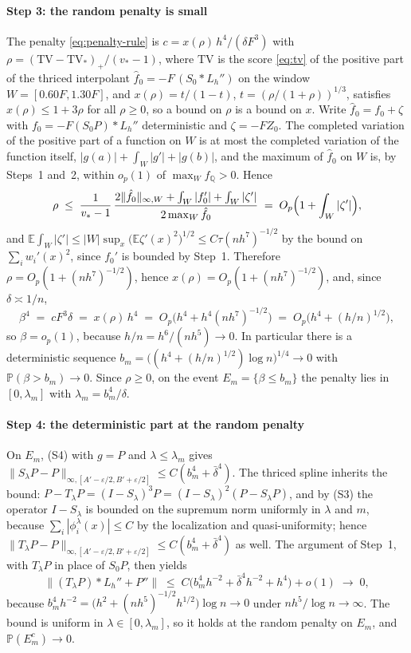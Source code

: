 \documentclass[preprint,12pt,authoryear,times]{elsarticle}
\newcommand{\E}{\mathbb{E}}
\newcommand{\Q}{\mathbb{Q}}
\newcommand{\Prob}{\mathbb{P}}
\newcommand{\TV}{\mathrm{TV}}
\begin{document}
\paragraph{Step 3: the random penalty is small}
The penalty \eqref{eq:penalty-rule} is \(c=x(\rho)\,h^4/(\delta F^3)\) with \(\rho=(\TV-\TV_*)_+/(v_*-1)\), where \(\TV\) is the score \eqref{eq:tv} of the positive part of the thriced interpolant \(\hat f_0=-F\,(S_0\ast L_h'')\) on the window \(W=[0.60F,1.30F]\), and \(x(\rho)=t/(1-t)\), \(t=(\rho/(1+\rho))^{1/3}\), satisfies \(x(\rho)\le 1+3\rho\) for all \(\rho\ge 0\), so a bound on \(\rho\) is a bound on \(x\). Write \(\hat f_0=f_0+\zeta\) with \(f_0=-F(S_0P)\ast L_h''\) deterministic and \(\zeta=-FZ_0\). The completed variation of the positive part of a function on \(W\) is at most the completed variation of the function itself, \(|g(a)|+\int_W|g'|+|g(b)|\), and the maximum of \(\hat f_0\) on \(W\) is, by Steps~1 and~2, within \(o_p(1)\) of \(\max_Wf_{\Q}>0\). Hence
\[
\rho\;\le\;\frac{1}{v_*-1}\,\frac{2\|\hat f_0\|_{\infty,W}+\int_W|f_0'|+\int_W|\zeta'|}{2\max_W\hat f_0}
\;=\;O_p\Bigl(1+\int_W|\zeta'|\Bigr),
\]
and \(\E\int_W|\zeta'|\le|W|\sup_x\bigl(\E\zeta'(x)^2\bigr)^{1/2}\le C\tau(nh^7)^{-1/2}\) by the bound on \(\sum_iw_i'(x)^2\), since \(f_0'\) is bounded by Step~1. Therefore \(\rho=O_p(1+(nh^7)^{-1/2})\), hence \(x(\rho)=O_p(1+(nh^7)^{-1/2})\), and, since \(\delta\asymp 1/n\),
\begin{equation}
\label{eq:pf-beta}
\beta^4\;=\;cF^3\delta\;=\;x(\rho)\,h^4\;=\;O_p\bigl(h^4+h^4(nh^7)^{-1/2}\bigr)\;=\;O_p\bigl(h^4+(h/n)^{1/2}\bigr),
\end{equation}
so \(\beta=o_p(1)\), because \(h/n=h^6/(nh^5)\to 0\). In particular there is a deterministic sequence \(b_m=\bigl((h^4+(h/n)^{1/2})\log n\bigr)^{1/4}\to 0\) with \(\Prob(\beta>b_m)\to 0\). Since \(\rho\ge 0\), on the event \(E_m=\{\beta\le b_m\}\) the penalty lies in \([0,\lambda_m]\) with \(\lambda_m=b_m^4/\delta\).

\paragraph{Step 4: the deterministic part at the random penalty}
On \(E_m\), (S4) with \(g=P\) and \(\lambda\le\lambda_m\) gives \(\|S_\lambda P-P\|_{\infty,[A'-\varepsilon/2,B'+\varepsilon/2]}\le C(b_m^4+\bar\delta^4)\). The thriced spline inherits the bound: \(P-T_\lambda P=(I-S_\lambda)^3P=(I-S_\lambda)^2(P-S_\lambda P)\), and by (S3) the operator \(I-S_\lambda\) is bounded on the supremum norm uniformly in \(\lambda\) and \(m\), because \(\sum_i|\phi_i^\lambda(x)|\le C\) by the localization and quasi-uniformity; hence \(\|T_\lambda P-P\|_{\infty,[A'-\varepsilon/2,B'+\varepsilon/2]}\le C(b_m^4+\bar\delta^4)\) as well. The argument of Step~1, with \(T_\lambda P\) in place of \(S_0P\), then yields
\[
\bigl\|(T_\lambda P)\ast L_h''+P''\bigr\|\;\le\;C\bigl(b_m^4h^{-2}+\bar\delta^4h^{-2}+h^4\bigr)+o(1)\;\to\;0 ,
\]
because \(b_m^4h^{-2}=\bigl(h^2+(nh^5)^{-1/2}h^{1/2}\bigr)\log n\to 0\) under \(nh^5/\log n\to\infty\). The bound is uniform in \(\lambda\in[0,\lambda_m]\), so it holds at the random penalty on \(E_m\), and \(\Prob(E_m^c)\to 0\).
\end{document}
